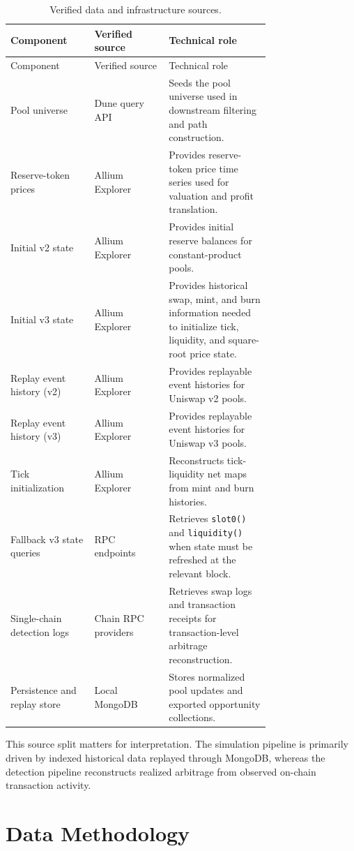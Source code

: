 \documentclass[11pt]{article}
\begin{document}
\small
\begin{longtable}{L{0.22\linewidth}L{0.22\linewidth}L{0.30\linewidth}}
\caption{Verified data and infrastructure sources.}
\label{tab:sources}\\
\toprule
Component & Verified source & Technical role \\
\midrule
\endfirsthead
\toprule
Component & Verified source & Technical role \\
\midrule
\endhead
Pool universe & Dune query API & Seeds the pool universe used in downstream filtering and path construction. \\
Reserve-token prices & Allium Explorer & Provides reserve-token price time series used for valuation and profit translation. \\
Initial v2 state & Allium Explorer & Provides initial reserve balances for constant-product pools. \\
Initial v3 state & Allium Explorer & Provides historical swap, mint, and burn information needed to initialize tick, liquidity, and square-root price state. \\
Replay event history (v2) & Allium Explorer & Provides replayable event histories for Uniswap v2 pools. \\
Replay event history (v3) & Allium Explorer & Provides replayable event histories for Uniswap v3 pools. \\
Tick initialization & Allium Explorer & Reconstructs tick-liquidity net maps from mint and burn histories. \\
Fallback v3 state queries & RPC endpoints & Retrieves \texttt{slot0()} and \texttt{liquidity()} when state must be refreshed at the relevant block. \\
Single-chain detection logs & Chain RPC providers & Retrieves swap logs and transaction receipts for transaction-level arbitrage reconstruction. \\
Persistence and replay store & Local MongoDB & Stores normalized pool updates and exported opportunity collections. \\
\bottomrule
\end{longtable}
\normalsize

This source split matters for interpretation. The simulation pipeline is primarily driven by indexed historical data replayed through MongoDB, whereas the detection pipeline reconstructs realized arbitrage from observed on-chain transaction activity.

\section{Data Methodology}
\end{document}
